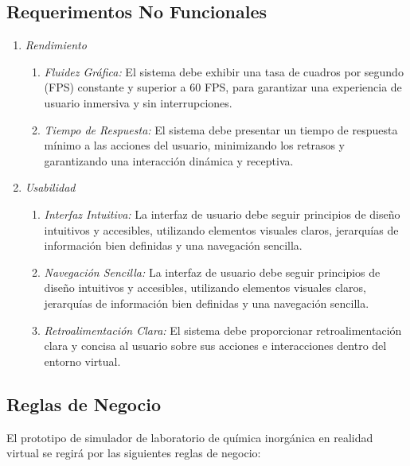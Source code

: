 \subsection{Requerimentos No Funcionales}
\begin{enumerate}[RNF1.]
    \item \textit{Rendimiento}
    \begin{enumerate}[{RNF1.}1.]
        \item \textit{Fluidez Gráfica: }El sistema debe exhibir una tasa de cuadros por segundo (FPS) constante y superior a 60 FPS, para garantizar una experiencia de usuario inmersiva y sin interrupciones.
        \item \textit{Tiempo de Respuesta: }El sistema debe presentar un tiempo de respuesta mínimo a las acciones del usuario, minimizando los retrasos y garantizando una interacción dinámica y receptiva.
    \end{enumerate}
    \item \textit{Usabilidad}
    \begin{enumerate}[{RNF2.}1.]
        \item \textit{Interfaz Intuitiva: }La interfaz de usuario debe seguir principios de diseño intuitivos y accesibles, utilizando elementos visuales claros, jerarquías de información bien definidas y una navegación sencilla. 
        \item \textit{Navegación Sencilla: }La interfaz de usuario debe seguir principios de diseño intuitivos y accesibles, utilizando elementos visuales claros, jerarquías de información bien definidas y una navegación sencilla. 
        \item \textit{Retroalimentación Clara: }El sistema debe proporcionar retroalimentación clara y concisa al usuario sobre sus acciones e interacciones dentro del entorno virtual. 
    \end{enumerate}
\end{enumerate}
\newpage
\subsection{Reglas de Negocio}
El prototipo de simulador de laboratorio de química inorgánica en realidad virtual se regirá por las siguientes reglas de negocio: 

